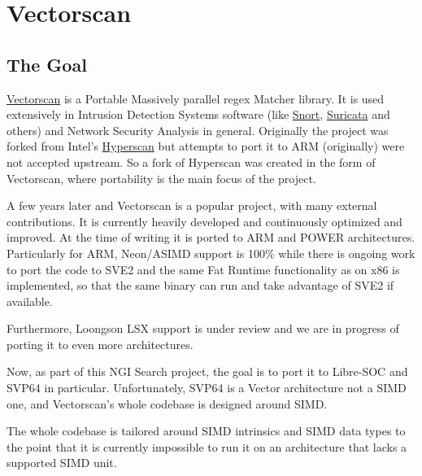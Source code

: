 %

\chapter{Vectorscan}

\section{The Goal}

\href{https://github.com/VectorCamp/vectorscan}{Vectorscan} is a Portable Massively parallel \acrfull{regex} Matcher library.
It is used extensively in Intrusion Detection Systems software (like
\href{https://www.snort.org/}{Snort},
\href{https://suricata.io/}{Suricata} and others) and Network Security Analysis in general.
Originally the project was forked from Intel's \href{https://github.com/intel/hyperscan}{Hyperscan}
but attempts to port it to \acrshort{ARM} (originally) were not accepted upstream.
So a fork of Hyperscan was created in the form of Vectorscan, where portability is the main focus of the project.
\par

A few years later and Vectorscan is a popular project, with many external contributions.
It is currently heavily developed and continuously optimized and improved.
At the time of writing it is ported to \acrshort{ARM} and \acrshort{POWER} architectures.
Particularly for \acrshort{ARM}, Neon/\acrshort{ASIMD} support is 100\%
while there is ongoing work to port the code to \acrshort{SVE2} and the same Fat Runtime functionality as on x86 is implemented,
so that the same binary can run and take advantage of \acrshort{SVE2} if available.
\par

Furthermore, Loongson \acrshort{LSX} support is under review and we are in progress of porting it to even more architectures.
\par

Now, as part of this \acrshort{NGI} Search project, the goal is to port it to Libre-SOC and \acrshort{SVP64} in particular.
Unfortunately, \acrshort{SVP64} is a Vector architecture not a \acrshort{SIMD} one, and Vectorscan's whole codebase is designed around \acrshort{SIMD}.
\par

The whole codebase is tailored around \acrshort{SIMD} intrinsics and \acrshort{SIMD} data types to the point
that it is currently impossible to run it on an architecture that lacks a supported \acrshort{SIMD} unit.
\par

